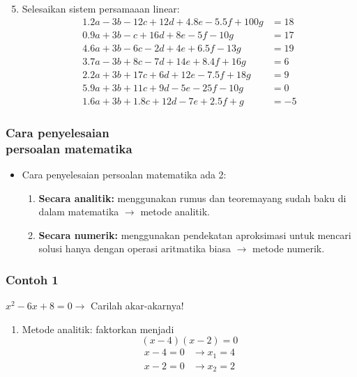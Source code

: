 \documentclass[pdflatex,compress]{beamer}
\begin{document}
\begin{frame}
	\begin{enumerate}
		\setcounter{enumi}{4}
		\item Selesaikan sistem persamaaan linear:
		\begin{align*}
			1.2a - 3b -  12c + 12d + 4.8e - 5.5f	+ 100g  &= 18 \\
			0.9a + 3b -    c + 16d +   8e -   5f	-  10g  &= 17 \\
			4.6a + 3b -   6c -  2d +   4e + 6.5f	-  13g  &= 19 \\
			3.7a - 3b +   8c -  7d +  14e + 8.4f	+  16g  &=  6 \\
			2.2a + 3b +  17c +  6d +  12e - 7.5f	+  18g  &=  9 \\
			5.9a + 3b +  11c +  9d -   5e -  25f	-  10g  &=  0 \\
			1.6a + 3b + 1.8c + 12d -   7e + 2.5f	+    g  &= -5
		\end{align*}
	\end{enumerate}
\end{frame}

\begin{frame}
\frametitle{Cara penyelesaian \\
	persoalan matematika}
	\begin{itemize}
		\item Cara penyelesaian persoalan matematika ada 2:
		\begin{enumerate}
			\item \textbf{Secara analitik:} menggunakan rumus dan teoremayang sudah baku di dalam matematika $\rightarrow$ metode analitik.
			\item \textbf{Secara numerik:} menggunakan pendekatan aproksimasi untuk mencari solusi hanya dengan operasi aritmatika biasa $\rightarrow$ metode numerik.
		\end{enumerate}
	\end{itemize}
\end{frame}

\begin{frame}
	\frametitle{Contoh 1}
	$ x^2 - 6x + 8 = 0 \rightarrow $ Carilah akar-akarnya! \\
	\begin{enumerate}
		\item Metode analitik: faktorkan menjadi $$ (x-4)(x-2) = 0 $$
			\begin{align*}
				x - 4 = 0 &\rightarrow x_1 = 4 \\
				x - 2 = 0 &\rightarrow x_2 = 2
			\end{align*}
	\end{enumerate}
\end{frame}
\end{document}
